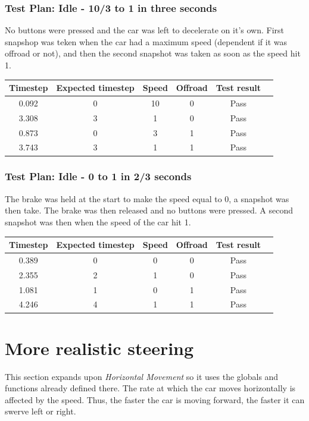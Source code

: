 \documentclass{article}
\begin{document}
\subsubsection*{Test Plan: Idle - 10/3 to 1 in three seconds}
No buttons were pressed and the car was left to decelerate on it's own. First snapshop was teken when the car had a maximum speed (dependent if it was offroad or not), and then the second snapshot was taken as soon as the speed hit 1.
\begin{center}
\begin{tabular}{ c c c c c c }
Timestep	& Expected timestep	& Speed	& Offroad	& Test result	\\ \hline
0.092		& 0				& 10		& 0		& Pass	\\
3.308		& 3				& 1		& 0		& Pass	\\
0.873		& 0				& 3		& 1		& Pass	\\
3.743		& 3				& 1		& 1		& Pass	\\ \hline
\end{tabular}
\end{center}
\newpage

\subsubsection*{Test Plan: Idle - 0 to 1 in 2/3 seconds}
The brake was held at the start to make the speed equal to 0, a snapshot was then take. The brake was then released and no buttons were pressed. A second snapshot was then when the speed of the car hit 1. 
\begin{center}
\begin{tabular}{ c c c c c c }
Timestep	& Expected timestep	& Speed	& Offroad	& Test result	\\ \hline
0.389		& 0				& 0		& 0		& Pass	\\
2.355		& 2				& 1		& 0		& Pass	\\
1.081		& 1				& 0		& 1		& Pass	\\
4.246		& 4				& 1		& 1		& Pass	\\ \hline
\end{tabular}
\end{center}

\clearpage

\section{More realistic steering}
This section expands upon \emph{Horizontal Movement} so it uses the globals and functions already defined there. The rate at which the car moves horizontally is affected by the speed. Thus, the faster the car is moving forward, the faster it can swerve left or right.
\end{document}
